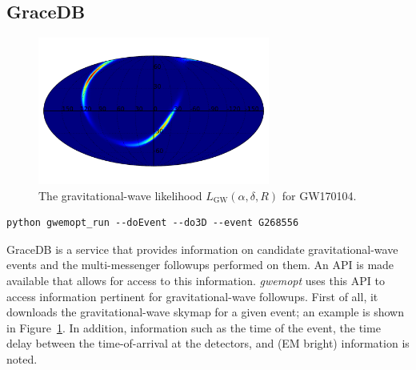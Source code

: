 \documentclass[twocolumn]{aastex61}
\newcommand{\rednote}[1]{{\color{red} (#1)}}
\begin{document}
\subsection{GraceDB}

\begin{figure}[t]
\hspace*{-0.5cm}
\centering
\includegraphics[width=3in]{prob.pdf}
\caption{The gravitational-wave likelihood $L_\textrm{GW}(\alpha,\delta,R)$ for GW170104.}
 \label{fig:skymap}
 \end{figure}

\begin{lstlisting}
python gwemopt_run --doEvent --do3D --event G268556
\end{lstlisting}

GraceDB is a service that provides information on candidate gravitational-wave events and the multi-messenger followups performed on them. An API is made available that allows for access to this information.
\emph{gwemopt} uses this API to access information pertinent for gravitational-wave followups.
First of all, it downloads the gravitational-wave skymap for a given event; an example is shown in Figure~\ref{fig:skymap}.
In addition, information such as the time of the event, the time delay between the time-of-arrival at the detectors, and \rednote{EM bright} information is noted.
\end{document}
